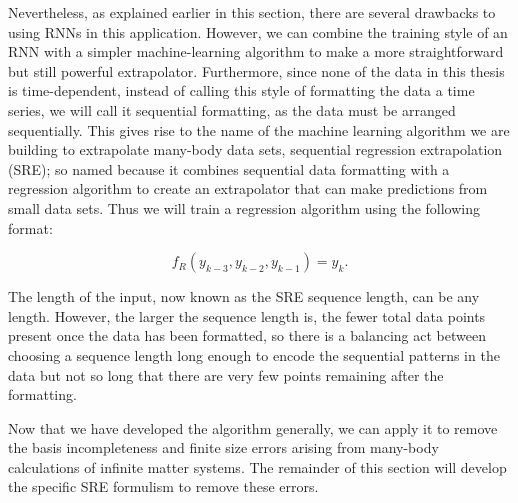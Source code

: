 Nevertheless, as explained earlier in this section, there are several drawbacks to using RNNs in this application. However, we can combine the training style of an RNN with a simpler machine-learning algorithm to make a more straightforward but still powerful extrapolator. Furthermore, since none of the data in this thesis is time-dependent, instead of calling this style of formatting the data a time series, we will call it sequential formatting, as the data must be arranged sequentially. This gives rise to the name of the machine learning algorithm we are building to extrapolate many-body data sets, sequential regression extrapolation (SRE); so named because it combines sequential data formatting with a regression algorithm to create an extrapolator that can make predictions from small data sets. Thus we will train a regression algorithm using the following format:

\begin{equation}
    f_{R}(y_{k-3}, y_{k-2}, y_{k-1}) = y_k.
\end{equation}

The length of the input, now known as the SRE sequence length, can be any length. However, the larger the sequence length is, the fewer total data points present once the data has been formatted, so there is a balancing act between choosing a sequence length long enough to encode the sequential patterns in the data but not so long that there are very few points remaining after the formatting.

Now that we have developed the algorithm generally, we can apply it to remove the basis incompleteness and finite size errors arising from many-body calculations of infinite matter systems. The remainder of this section will develop the specific SRE formulism to remove these errors.


